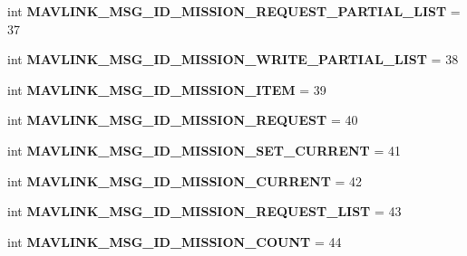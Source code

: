 \begin{DoxyCompactItemize}
int {\bfseries M\+A\+V\+L\+I\+N\+K\+\_\+\+M\+S\+G\+\_\+\+I\+D\+\_\+\+M\+I\+S\+S\+I\+O\+N\+\_\+\+R\+E\+Q\+U\+E\+S\+T\+\_\+\+P\+A\+R\+T\+I\+A\+L\+\_\+\+L\+I\+ST} = 37
\item 
\mbox{\label{namespacepymavlink_1_1dialects_1_1v10_a2b9be20acd2767f911f5108759de47e0}} 
int {\bfseries M\+A\+V\+L\+I\+N\+K\+\_\+\+M\+S\+G\+\_\+\+I\+D\+\_\+\+M\+I\+S\+S\+I\+O\+N\+\_\+\+W\+R\+I\+T\+E\+\_\+\+P\+A\+R\+T\+I\+A\+L\+\_\+\+L\+I\+ST} = 38
\item 
\mbox{\label{namespacepymavlink_1_1dialects_1_1v10_a858b2db06668b21e9164e0e078f7f6b1}} 
int {\bfseries M\+A\+V\+L\+I\+N\+K\+\_\+\+M\+S\+G\+\_\+\+I\+D\+\_\+\+M\+I\+S\+S\+I\+O\+N\+\_\+\+I\+T\+EM} = 39
\item 
\mbox{\label{namespacepymavlink_1_1dialects_1_1v10_ad96eb6653afc47458b98ef2cb460e15d}} 
int {\bfseries M\+A\+V\+L\+I\+N\+K\+\_\+\+M\+S\+G\+\_\+\+I\+D\+\_\+\+M\+I\+S\+S\+I\+O\+N\+\_\+\+R\+E\+Q\+U\+E\+ST} = 40
\item 
\mbox{\label{namespacepymavlink_1_1dialects_1_1v10_aea720477ce164fca8c526b4ef319ce33}} 
int {\bfseries M\+A\+V\+L\+I\+N\+K\+\_\+\+M\+S\+G\+\_\+\+I\+D\+\_\+\+M\+I\+S\+S\+I\+O\+N\+\_\+\+S\+E\+T\+\_\+\+C\+U\+R\+R\+E\+NT} = 41
\item 
\mbox{\label{namespacepymavlink_1_1dialects_1_1v10_aab4c702633606c072a76945664ad3a46}} 
int {\bfseries M\+A\+V\+L\+I\+N\+K\+\_\+\+M\+S\+G\+\_\+\+I\+D\+\_\+\+M\+I\+S\+S\+I\+O\+N\+\_\+\+C\+U\+R\+R\+E\+NT} = 42
\item 
\mbox{\label{namespacepymavlink_1_1dialects_1_1v10_a509c3558bd8404af3275511bf6a6ce61}} 
int {\bfseries M\+A\+V\+L\+I\+N\+K\+\_\+\+M\+S\+G\+\_\+\+I\+D\+\_\+\+M\+I\+S\+S\+I\+O\+N\+\_\+\+R\+E\+Q\+U\+E\+S\+T\+\_\+\+L\+I\+ST} = 43
\item 
\mbox{\label{namespacepymavlink_1_1dialects_1_1v10_a941a647187512eac6916c9d8f00abca9}} 
int {\bfseries M\+A\+V\+L\+I\+N\+K\+\_\+\+M\+S\+G\+\_\+\+I\+D\+\_\+\+M\+I\+S\+S\+I\+O\+N\+\_\+\+C\+O\+U\+NT} = 44

\end{DoxyCompactItemize}
